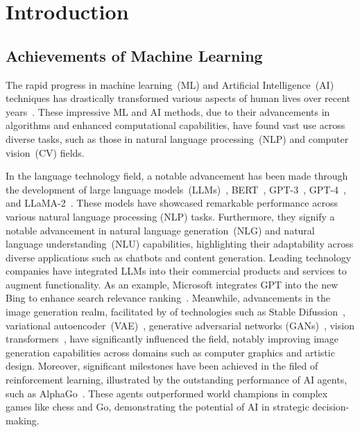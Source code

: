\chapter{Introduction}\label{chap:intro}

\section{Achievements of Machine Learning}

The rapid progress in machine learning~(ML) and Artificial Intelligence~(AI) techniques
has drastically transformed various aspects of human lives over recent years~\cite{bengio-nature15,taward18}.
%
These impressive ML and AI methods, due to their advancements in algorithms
and enhanced computational capabilities,
have found vast use across
diverse tasks, such as those in natural language processing~(NLP) and computer vision~(CV) fields.



In the language technology field, a notable advancement has been made through the development
of large language models~(LLMs)~\cite{llm-tist23,gptedu-lid23,transformer-17}, BERT~\cite{dclt-bert19}, GPT-3~\cite{gpt-3-neurips20}, GPT-4~\cite{gpt-4-corr23}, and LLaMA-2~\cite{llama-2-corr23}.
%
These models have showcased remarkable performance across various natural language processing (NLP) tasks.
%
Furthermore, they signify a notable advancement in natural language generation~(NLG) 
and natural language understanding~(NLU) capabilities, 
highlighting their adaptability across diverse applications such as chatbots and content generation.
%
Leading technology companies have integrated LLMs into their commercial products 
and services to augment functionality.
%
As an example, Microsoft integrates GPT into the new Bing to enhance search relevance ranking~\cite{bing-17}.
%
Meanwhile, advancements in the image generation realm, facilitated by of technologies 
such as Stable Difussion~\cite{rbleo-cvpr22}, variational autoencoder~(VAE)~\cite{kw-corr13}, generative adversarial networks (GANs)~\cite{gan-corr14},
vision transformers~\cite{vtransformer-21}, have significantly influenced the field,
notably improving image generation capabilities across domains such as computer graphics and artistic design.
%
Moreover, significant milestones have been achieved in the filed of reinforcement learning, 
illustrated by the outstanding performance of AI agents, such as AlphaGo~\cite{rl-nature15,rlchess-science18,rlgo-nature17}.
%
These agents outperformed world champions in complex games like chess and Go,
demonstrating the potential of AI in strategic decision-making.

